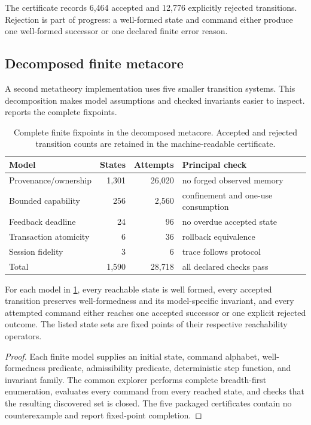 The certificate records 6,464 accepted and 12,776 explicitly rejected transitions.  Rejection is part of progress: a well-formed state and command either produce one well-formed successor or one declared finite error reason.

\subsection{Decomposed finite metacore}

A second metatheory implementation uses five smaller transition systems.  This decomposition makes model assumptions and checked invariants easier to inspect.   reports the complete fixpoints.

\begin{table}[ht]
\centering
\small
\begin{tabular}{@{}p{}rrp{}@{}}
\toprule
Model & States & Attempts & Principal check \\
\midrule
Provenance/ownership & 1,301 & 26,020 & no forged observed memory \\
Bounded capability & 256 & 2,560 & confinement and one-use consumption \\
Feedback deadline & 24 & 96 & no overdue accepted state \\
Transaction atomicity & 6 & 36 & rollback equivalence \\
Session fidelity & 3 & 6 & trace follows protocol \\
\midrule
Total & 1,590 & 28,718 & all declared checks pass \\
\bottomrule
\end{tabular}
\caption{Complete finite fixpoints in the decomposed metacore.  Accepted and rejected transition counts are retained in the machine-readable certificate.}
\label{tab:metacore-results}
\end{table}

\begin{theorem}
For each model in \cref{tab:metacore-results}, every reachable state is well formed, every accepted transition preserves well-formedness and its model-specific invariant, and every attempted command either reaches one accepted successor or one explicit rejected outcome.  The listed state sets are fixed points of their respective reachability operators.
\end{theorem}

\begin{proof}
Each finite model supplies an initial state, command alphabet, well-formedness predicate, admissibility predicate, deterministic step function, and invariant family.  The common explorer performs complete breadth-first enumeration, evaluates every command from every reached state, and checks that the resulting discovered set is closed.  The five packaged certificates contain no counterexample and report fixed-point completion.  \qedhere
\end{proof}

